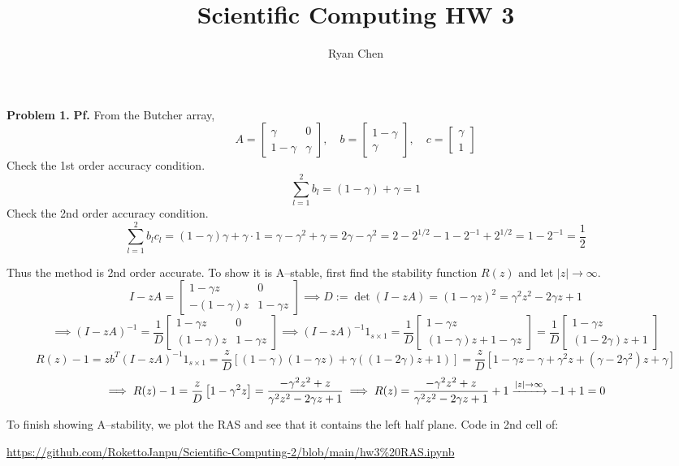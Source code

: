 \documentclass{article}
\title{Scientific Computing HW 3}
\author{Ryan Chen}
\def\tbf#1{\textbf{#1}}
\newcommand{\sbr}[1]{\left[#1\right]}
\newcommand{\m}[2][b]{\begin{#1matrix}#2\end{#1matrix}}
\newcommand{\inv}{^{-1}}
\newcommand{\pf}{\tbf{Pf. }}
\newcommand{\imp}{\implies}
\begin{document}
\maketitle



\tbf{Problem 1.} \pf From the Butcher array,
$$A = \m{\gamma & 0 \\ 1-\gamma & \gamma},
\quad b = \m{1-\gamma \\ \gamma},
\quad c = \m{\gamma \\ 1}$$
Check the 1st order accuracy condition.
$$\sum_{l=1}^2 b_l = (1-\gamma)+\gamma = 1$$
Check the 2nd order accuracy condition.
$$\sum_{l=1}^2 b_lc_l = (1-\gamma)\gamma+\gamma\cdot 1
= \gamma-\gamma^2+\gamma
= 2\gamma-\gamma^2
= 2-2^{1/2}-1-2\inv+2^{1/2}
= 1-2\inv
= \frac12$$

Thus the method is 2nd order accurate. To show it is A--stable, first find the stability function $R(z)$ and let $|z|\to\infty$. 
$$I - zA = \m{1-\gamma z & 0 \\ -(1-\gamma)z & 1-\gamma z}
\imp D := \det(I-zA) = (1-\gamma z)^2 = \gamma^2z^2 - 2\gamma z+1$$
$$\imp (I-zA)\inv = \frac1D\m{1-\gamma z & 0 \\ (1-\gamma)z & 1-\gamma z}
\imp (I-zA)\inv 1_{s\times 1} = \frac1D\m{1-\gamma z \\ (1-\gamma)z+1-\gamma z} = \frac1D\m{1-\gamma z \\ (1-2\gamma)z+1}$$
$$R(z) - 1 = zb^T(I-zA)\inv 1_{s\times 1} = \frac zD\sbr{(1-\gamma)(1-\gamma z)+\gamma((1-2\gamma)z+1)}
= \frac zD\sbr{1-\gamma z-\gamma+\gamma^2z+(\gamma-2\gamma^2)z+\gamma}$$
$$\imp R(z) - 1 = \frac zD\sbr{1-\gamma^2z}
= \frac{-\gamma^2z^2+z}{\gamma^2z^2-2\gamma z+1}
\imp R(z) = \frac{-\gamma^2z^2+z}{\gamma^2z^2-2\gamma z+1} + 1 \app[|z|] -1+1 = 0$$

To finish showing A--stability, we plot the RAS and see that it contains the left half plane. Code in 2nd cell of:  

\url{https://github.com/RokettoJanpu/Scientific-Computing-2/blob/main/hw3%20RAS.ipynb}
\end{document}

